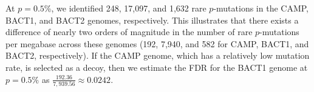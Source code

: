 At $p=0.5$\%, we identified 248, 17,097, and 1,632 rare $p$-mutations in the CAMP, BACT1, and BACT2 genomes, respectively. This illustrates that there exists a difference of nearly two orders of magnitude in the number of rare $p$-mutations per megabase across these genomes (192, 7,940, and 582 for CAMP, BACT1, and BACT2, respectively). If the CAMP genome, which has a relatively low mutation rate, is selected as a decoy, then we estimate the FDR for the BACT1 genome at $p=0.5\%$ as $\frac{192.36}{7,939.56} \approx 0.0242$.\endinput